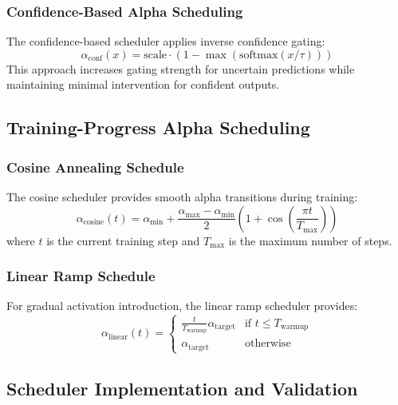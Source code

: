 \documentclass[lettersize,journal]{IEEEtran}
\begin{document}
\subsubsection{Confidence-Based Alpha Scheduling}
The confidence-based scheduler applies inverse confidence gating:
\begin{equation}
\alpha_{\text{conf}}(x) = \text{scale} \cdot \left(1 - \max(\text{softmax}(x/\tau))\right)
\end{equation}
This approach increases gating strength for uncertain predictions while maintaining minimal intervention for confident outputs.

\subsection{Training-Progress Alpha Scheduling}

\subsubsection{Cosine Annealing Schedule}
The cosine scheduler provides smooth alpha transitions during training:
\begin{equation}
\alpha_{\text{cosine}}(t) = \alpha_{\min} + \frac{\alpha_{\max} - \alpha_{\min}}{2}\left(1 + \cos\left(\frac{\pi t}{T_{\max}}\right)\right)
\end{equation}
where $t$ is the current training step and $T_{\max}$ is the maximum number of steps.

\subsubsection{Linear Ramp Schedule}
For gradual activation introduction, the linear ramp scheduler provides:
\begin{equation}
\alpha_{\text{linear}}(t) = \begin{cases}
\frac{t}{T_{\text{warmup}}} \alpha_{\text{target}} & \text{if } t \leq T_{\text{warmup}} \\
\alpha_{\text{target}} & \text{otherwise}
\end{cases}
\end{equation}

\subsection{Scheduler Implementation and Validation}
\end{document}
